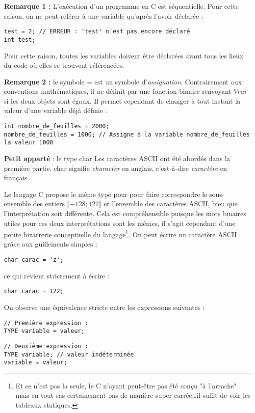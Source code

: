 \documentclass[../../../main.tex]{subfiles}
\begin{document}
\textbf{Remarque 1 :} L'exécution d'un programme en C est séquentielle. Pour cette raison, on ne peut référer à une variable qu'après l'avoir déclarée :
\begin{verbatim}
test = 2; // ERREUR : 'test' n'est pas encore déclaré
int test;
\end{verbatim}
Pour cette raison, toutes les variables doivent être déclarées avant tous les lieux du code où elles se trouvent référencées.
 
\textbf{Remarque 2 :} le symbole \textsf{=} est un symbole d'\textit{assignation}. Contrairement aux conventions mathématiques, il ne définit par une fonction binaire renvoyant $Vrai$ si les deux objets sont égaux. Il permet cependant de changer à tout instant la valeur d'une variable déjà définie :
\begin{verbatim}
int nombre_de_feuilles = 2000;
nombre_de_feuilles = 1000; // Assigne à la variable nombre_de_feuilles la valeur 1000
\end{verbatim}

\begin{minitelbasicbox}{\textbf{Petit apparté} : le type \textsf{char}}
Les caractères ASCII ont été abordés dans la première partie. \textsf{char} signifie \textit{character} en anglais, c'est-à-dire \textit{caractère} en français.

Le langage C propose le même type pour pour faire correspondre le sous-ensemble des entiers $\llbracket-128; 127\rrbracket$ et l'ensemble des caractères ASCII, bien que l'interprétation soit différente. Cela est compréhensible puisque les mots binaires utiles pour ces deux interprétations sont les mêmes, il s'agit cependant d'une petite bizarrerie conceptuelle du langage\footnote{Et ce n'est pas la seule, le C n'ayant peut-être pas été conçu "à l'arrache" mais en tout cas certainement pas de manière super carrée\dots il suffit de voir les tableaux statiques.}. On peut écrire un caractère ASCII grâce aux guillements simples :
\begin{verbatim}
char carac = 'z';
\end{verbatim}
ce qui revient strictement à écrire :
\begin{verbatim}
char carac = 122;
\end{verbatim}
\end{minitelbasicbox}

On observe une équivalence stricte entre les expressions suivantes : 

\begin{minipage}{0.5\textwidth}
\begin{verbatim}
// Première expression :
TYPE variable = valeur;

\end{verbatim}
\end{minipage}
\begin{minipage}{0.5\textwidth}
\begin{verbatim}
// Deuxième expression :
TYPE variable; // valeur indéterminée
variable = valeur;
\end{verbatim}
\end{minipage}
\end{document}
